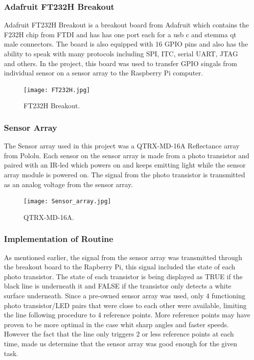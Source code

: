 \subsubsection{Adafruit FT232H Breakout}
Adafruit FT232H Breakout is a breakout board from Adafruit which contains the F232H chip from FTDI and has has one port each for a usb c and stemma qt male connectors. The board is also equipped with 16 GPIO pins and also has the ability to speak with many protocols including SPI, ITC, serial UART, JTAG and others. In the project, this board was used to transfer GPIO singals from individual sensor on a sensor array to the Raspberry Pi computer. 
\begin{figure}[H]
    \centering
    \texttt{[image: FT232H.jpg]}
    \caption{FT232H Breakout.}
    \label{FT232H}
\end{figure}

\subsubsection{Sensor Array}
The Sensor array used in this project was a QTRX-MD-16A Reflectance array from Pololu. Each sensor on the sensor array is made from a photo transistor and paired with an IR-led which powers on and keeps emitting light while the sensor array module is powered on. The signal from the photo transistor is transmitted as an analog voltage from the sensor array. 
\begin{figure}[H]
    \centering
    \texttt{[image: Sensor\_array.jpg]}
    \caption{QTRX-MD-16A.}
    \label{Sensor_array}
\end{figure}
\subsubsection{Implementation of Routine}
As mentioned earlier, the signal from the sensor array was transmitted through the breakout board to the Rapberry Pi, this signal included the state of each photo transistor. The state of each transistor is being displayed as TRUE if the black line is underneath it and FALSE if the transistor only detects a white surface underneath. Since a pre-owned sensor array was used, only 4 functioning photo transistor/LED pairs that were close to each other were available, limiting the line following procedure to 4 reference points. More reference points may have proven to be more optimal in the case whit sharp angles and faster speeds. However the fact that the line only triggers 2 or less reference points at each time, made us determine that the sensor array was good enough for the given task.

